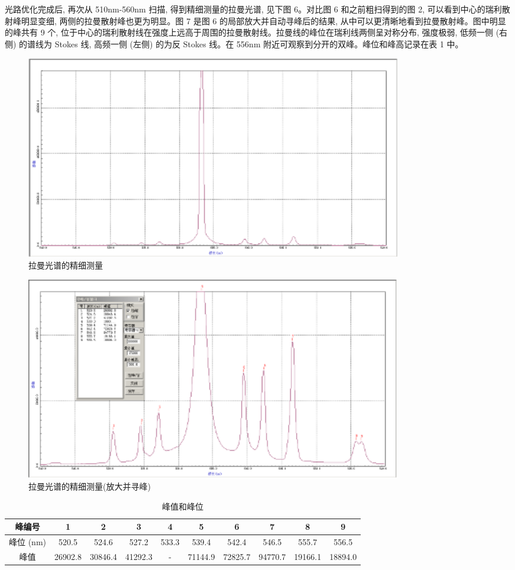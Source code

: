 \documentclass{article}
\begin{document}
光路优化完成后, 再次从 510nm-560nm 扫描, 得到精细测量的拉曼光谱, 见下图 6。对比图 6 和之前粗扫得到的图 2, 可以看到中心的瑞利散射峰明显变细, 两侧的拉曼散射峰也更为明显。图 7 是图 6 的局部放大并自动寻峰后的结果, 从中可以更清晰地看到拉曼散射峰。图中明显的峰共有 9 个, 位于中心的瑞利散射线在强度上远高于周围的拉曼散射线。拉曼线的峰位在瑞利线两侧呈对称分布, 强度极弱, 低频一侧 (右侧) 的谱线为 Stokes 线, 高频一侧 (左侧) 的为反 Stokes 线。在 556nm 附近可观察到分开的双峰。峰位和峰高记录在表 1 中。

\begin{figure}[h]
    \centering
    \includegraphics[width=0.8\textwidth]{图片 6.png} %
    \caption{拉曼光谱的精细测量}
    \label{fig:fine_scan}
\end{figure}

\begin{figure}[H]
    \centering
    \includegraphics[width=0.8\textwidth]{图片 7.png} %
    \caption{拉曼光谱的精细测量(放大并寻峰)}
    \label{fig:fine_scan_zoom}
\end{figure}


\begin{table}[h]
    \centering
    \caption{峰值和峰位}
    \begin{tabular}{cccccccccc}
        \toprule
        峰编号 & 1 & 2 & 3 & 4 & 5 & 6 & 7 & 8 & 9 \\
        \midrule
        峰位 (nm) & 520.5 & 524.6 & 527.2 & 533.3 & 539.4 & 542.4 & 546.5 & 555.7 & 556.5 \\
        \hline
        峰值 & 26902.8 & 30846.4 & 41292.3 & - & 71144.9 & 72825.7 & 94770.7 & 19166.1 & 18894.0 \\
        \bottomrule
    \end{tabular}
    \label{tab:peak_values1}
\end{table}
\end{document}
